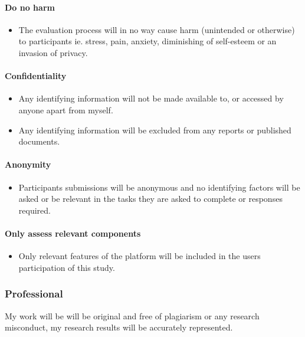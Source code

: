 \documentclass[lettersize,journal]{IEEEtran}
\begin{document}
		\paragraph{Do no harm}
		\begin{itemize}
			\item The evaluation process will in no way cause harm (unintended or otherwise) to participants ie. stress, pain, anxiety,
				diminishing of self-esteem or an invasion of privacy.

		\end{itemize}
		\paragraph{Confidentiality}
		\begin{itemize}
			\item Any identifying information will not be made available to, or accessed by anyone apart from myself.
			\item Any identifying information will be excluded from any reports or published documents.
		\end{itemize}
		\paragraph{Anonymity}
		\begin{itemize}
			\item Participants submissions will be anonymous and no identifying factors will be asked or be relevant in the tasks they are asked to 
				complete or responses required.
		\end{itemize}
		\paragraph{Only assess relevant components}
		\begin{itemize}
			\item Only relevant features of the platform will be included in the users participation of this study.
		\end{itemize}
		
	\subsubsection{Professional}
	My work will be will be original and free of plagiarism or any research misconduct, my research results will be accurately represented.
\end{document}
